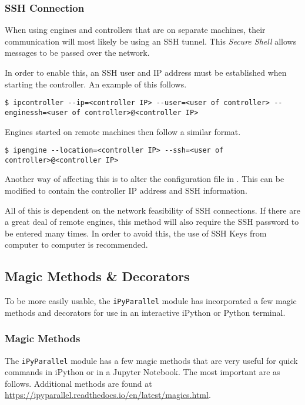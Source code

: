 \subsubsection*{SSH Connection}
When using engines and controllers that are on separate machines, their communication will most likely be using an SSH tunnel.
This \emph{Secure Shell} allows messages to be passed over the network.

In order to enable this, an SSH user and IP address must be established when starting the controller.
An example of this follows.

\begin{lstlisting}[style=ShellInput]
$ ipcontroller --ip=<controller IP> --user=<user of controller> --enginessh=<user of controller>@<controller IP>
\end{lstlisting}

Engines started on remote machines then follow a similar format.

\begin{lstlisting}[style=ShellInput]
$ ipengine --location=<controller IP> --ssh=<user of controller>@<controller IP>
\end{lstlisting}

Another way of affecting this is to alter the configuration file in .
This can be modified to contain the controller IP address and SSH information.

All of this is dependent on the network feasibility of SSH connections.
If there are a great deal of remote engines, this method will also require the SSH password to be entered many times.
In order to avoid this, the use of SSH Keys from computer to computer is recommended.


\subsection*{Magic Methods \& Decorators}
To be more easily usable, the \texttt{iPyParallel} module has incorporated a few magic methods and decorators for use in an interactive iPython or Python terminal.

\subsubsection*{Magic Methods}
The \texttt{iPyParallel} module has a few magic methods that are very useful for quick commands in iPython or in a Jupyter Notebook.
The most important are as follows.
Additional methods are found at \url{https://ipyparallel.readthedocs.io/en/latest/magics.html}.

